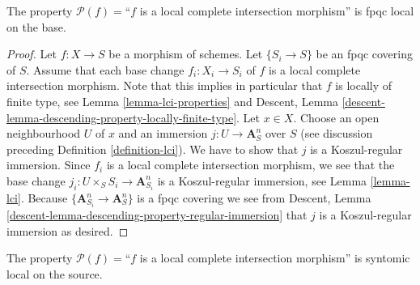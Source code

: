 \begin{lemma}
\label{lemma-descending-property-lci}
The property $\mathcal{P}(f) =$``$f$ is a local complete intersection
morphism'' is fpqc local on the base.
\end{lemma}

\begin{proof}
Let $f : X \to S$ be a morphism of schemes.
Let $\{S_i \to S\}$ be an fpqc covering of $S$.
Assume that each base change $f_i : X_i \to S_i$ of $f$ is
a local complete intersection morphism.
Note that this implies in particular that $f$ is locally of finite
type, see
Lemma \ref{lemma-lci-properties}
and
Descent, Lemma \ref{descent-lemma-descending-property-locally-finite-type}.
Let $x \in X$. Choose an open neighbourhood $U$ of $x$ and
an immersion $j : U \to \mathbf{A}^n_S$ over $S$ (see
discussion preceding
Definition \ref{definition-lci}).
We have to show that $j$ is a Koszul-regular immersion.
Since $f_i$ is a local complete intersection morphism, we see
that the base change $j_i : U \times_S S_i \to \mathbf{A}^n_{S_i}$
is a Koszul-regular immersion, see
Lemma \ref{lemma-lci}.
Because $\{\mathbf{A}^n_{S_i} \to \mathbf{A}^n_S\}$ is a
fpqc covering we see from
Descent, Lemma \ref{descent-lemma-descending-property-regular-immersion}
that $j$ is a Koszul-regular immersion as desired.
\end{proof}

\begin{lemma}
\label{lemma-lci-syntomic-local-source}
The property $\mathcal{P}(f) =$``$f$ is a local complete intersection
morphism'' is syntomic local on the source.
\end{lemma}

